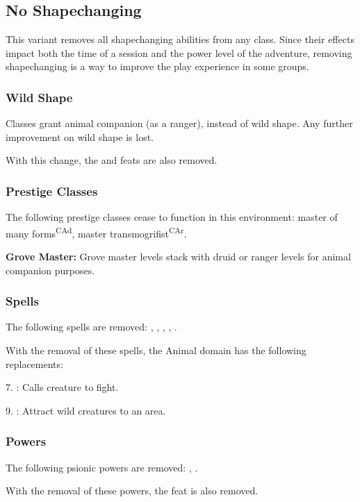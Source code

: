 \subsection{No Shapechanging}
This variant removes all shapechanging abilities from any class. Since their effects impact both the time of a session and the power level of the adventure, removing shapechanging is a way to improve the play experience in some groups.

\subsubsection{Wild Shape}
Classes grant animal companion (as a ranger), instead of wild shape. Any further improvement on wild shape is lost.

With this change, the  and  feats are also removed.

\subsubsection{Prestige Classes}
The following prestige classes cease to function in this environment: master of many forms\textsuperscript{CAd}, master transmogrifist\textsuperscript{CAr}.

\textbf{Grove Master:} Grove master levels stack with druid or ranger levels for animal companion purposes.

\subsubsection{Spells}
The following spells are removed:
,
,
,
,
.

With the removal of these spells, the Animal domain has the following replacements:
\begin{itemize*}
	\item[7.] : Calls creature to fight.
	\item[9.] : Attract wild creatures to an area.
\end{itemize*}


\subsubsection{Powers}
The following psionic powers are removed:
,
.

With the removal of these powers, the  feat is also removed.